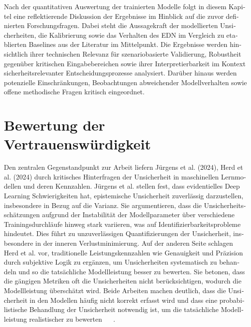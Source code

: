 


\begin{otherlanguage}{ngerman}
Nach der quantitativen Auswertung der trainierten Modelle folgt in diesem Kapitel eine reflektierende Diskussion der Ergebnisse im Hinblick auf die zuvor definierten Forschungsfragen. Dabei steht die Aussagekraft der modellierten Unsicherheiten, die Kalibrierung sowie das Verhalten des EDN im Vergleich zu etablierten Baselines aus der Literatur im Mittelpunkt. Die Ergebnisse werden hinsichtlich ihrer technischen Relevanz für szenariobasierte Validierung, Robustheit gegenüber kritischen Eingabebereichen sowie ihrer Interpretierbarkeit im Kontext sicherheitsrelevanter Entscheidungsprozesse analysiert. Darüber hinaus werden potenzielle Einschränkungen, Beobachtungen abweichender Modellverhalten sowie offene methodische Fragen kritisch eingeordnet.

\section{Bewertung der Vertrauenswürdigkeit}


Den zentralen Gegenstandpunkt zur Arbeit liefern Jürgens et al. (2024), Herd et al. (2024) durch kritisches Hinterfragen der Unsicherheit in maschinellen Lernmodellen und deren Kennzahlen. Jürgens et al. stellen fest, dass evidentielles Deep Learning Schwierigkeiten hat, epistemische Unsicherheit zuverlässig darzustellen, insbesondere in Bezug auf die Varianz. Sie argumentieren, dass die Unsicherheitsschätzungen aufgrund der Instabilität der Modellparameter über verschiedene Trainingsdurchläufe hinweg stark variieren, was auf Identifizierbarkeitsprobleme hindeutet. Dies führt zu unzuverlässigen Quantifizierungen der Unsicherheit, insbesondere in der inneren Verlustminimierung. Auf der anderen Seite schlagen Herd et al. vor, traditionelle Leistungskennzahlen wie Genauigkeit und Präzision durch subjektive Logik zu ergänzen, um Unsicherheiten systematisch zu behandeln und so die tatsächliche Modellleistung besser zu bewerten. Sie betonen, dass die gängigen Metriken oft die Unsicherheiten nicht berücksichtigen, wodurch die Modellleistung überschätzt wird. Beide Arbeiten machen deutlich, dass die Unsicherheit in den Modellen häufig nicht korrekt erfasst wird und dass eine probabilistische Behandlung der Unsicherheit notwendig ist, um die tatsächliche Modellleistung realistischer zu bewerten ~\parencite{Jurgens.} ~\parencite{Herd04082024}.


\end{otherlanguage}
